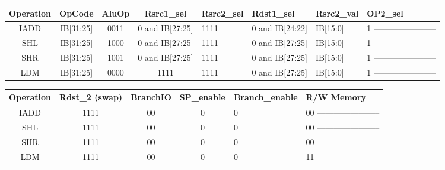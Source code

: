 \documentclass[12pt]{report}
\begin{document}
\begin{itemize}
        \begin{center}
        \begin{tabular}{||c| c| c| c| p{40mm}||} 
        \hline
        Operation & OpCode & AluOp & Rsrc1_sel & Rsrc2_sel & Rdst1_sel & Rsrc2_val & OP2_sel  \\ [0.5ex] 
        \hline\hline
        IADD& IB[31:25] & 0011 & 0 and IB[27:25] & 1111 & 0 and IB[24:22] & IB[15:0] & 1 ----------------------- \\
        SHL & IB[31:25] & 1000 & 0 and IB[27:25] & 1111 & 0 and IB[27:25] & IB[15:0] & 1 ----------------------- \\
        SHR & IB[31:25] & 1001 & 0 and IB[27:25] & 1111 & 0 and IB[27:25] & IB[15:0] & 1 ----------------------- \\
        LDM & IB[31:25] & 0000 & 1111 & 1111 & 0 and IB[27:25] & IB[15:0] & 1 ----------------------- \\
        
        \hline

        \end{tabular}
        \end{center}

        \begin{center}
        \begin{tabular}{||c| c| c| c| p{40mm}||} 
        \hline
        Operation & Rdst_2 (swap) & BranchIO & SP_enable & Branch_enable & R/W Memory  \\ [0.5ex] 
        \hline\hline
        IADD & 1111 & 00 & 0 & 0 & 00 ----------------------- \\
        SHL & 1111 & 00 & 0 & 0 & 00 ----------------------- \\
        SHR & 1111 & 00 & 0 & 0 & 00 ----------------------- \\
        LDM & 1111 & 00 & 0 & 0 & 11 ----------------------- \\
        \hline

        \end{tabular}
        \end{center}


        

\end{itemize}
\end{document}
